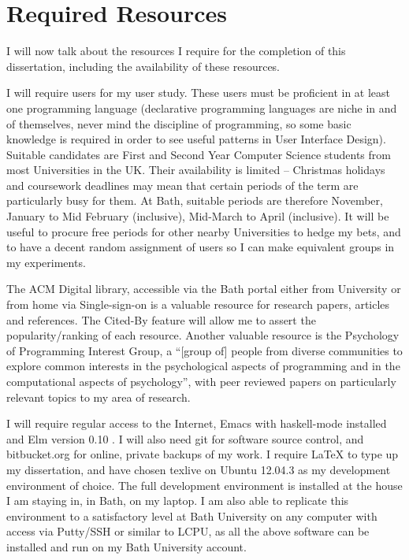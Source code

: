 \chapter{Required Resources}

I will now talk about the resources I require for the completion of this
dissertation, including the availability of these resources.

I will require users for my user study. These users must be proficient in at
least one programming language (declarative programming languages are niche in
and of themselves, never mind the discipline of programming, so some basic
knowledge is required in order to see useful patterns in User Interface Design).
Suitable candidates are First and Second Year
Computer Science students from most Universities in the UK. Their availability
is limited -- Christmas holidays and coursework deadlines may mean that certain
periods of the term are particularly busy for them. At Bath, suitable periods are
therefore November, January to Mid February (inclusive), Mid-March to April
(inclusive). It will be useful to procure free periods for other nearby
Universities to hedge my bets, and to have a decent random assignment of users so I
can make equivalent groups in my experiments.

The ACM Digital library, accessible via the Bath portal either from University
or from home via Single-sign-on is a valuable resource for research papers,
articles and references. The Cited-By feature will allow me to assert the
popularity/ranking of each resource. Another valuable resource is the Psychology
of Programming Interest Group, a ``[group of] people from diverse communities to explore
common interests in the psychological aspects of programming and in the
computational aspects of psychology'', with peer reviewed papers on particularly
relevant topics to my area of research.

I will require regular access to the Internet, Emacs with haskell-mode installed and Elm version 0.10
\cite{Elm2013a}. I will also need git for software source control, and
bitbucket.org for online, private backups of my work.
I require LaTeX to type up my dissertation, and have chosen texlive on Ubuntu 12.04.3
as my development environment of choice. The full development environment is
installed at the house I am staying in, in Bath, on my laptop. I am also able to
replicate this environment to a satisfactory level at Bath University on any
computer with access via Putty/SSH or similar to LCPU, as all the above software
can be installed and run on my Bath University account.

